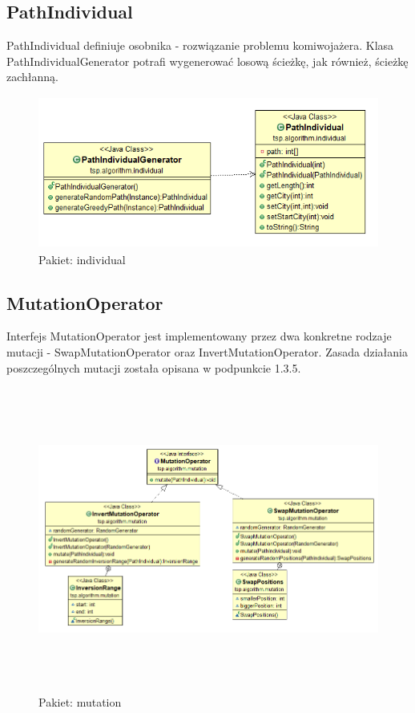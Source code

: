 \documentclass[a4paper,11pt]{article}
\begin{document}
\subsection{PathIndividual}

PathIndividual definiuje osobnika - rozwiązanie problemu komiwojażera. Klasa PathIndividualGenerator potrafi wygenerować losową ścieżkę, jak również, ścieżkę zachłanną.

\begin{figure}[H]
\centering
\includegraphics[height=5cm]{pathIndividual.PNG}
\caption{Pakiet: individual}
\end{figure}

\subsection{MutationOperator}

Interfejs MutationOperator jest implementowany przez dwa konkretne rodzaje mutacji - SwapMutationOperator oraz InvertMutationOperator. Zasada działania poszczególnych mutacji została opisana w podpunkcie 1.3.5.

\begin{figure}[H]
\centering
\includegraphics[height=10cm]{mutation.PNG}
\caption{Pakiet: mutation}
\end{figure}
\end{document}
